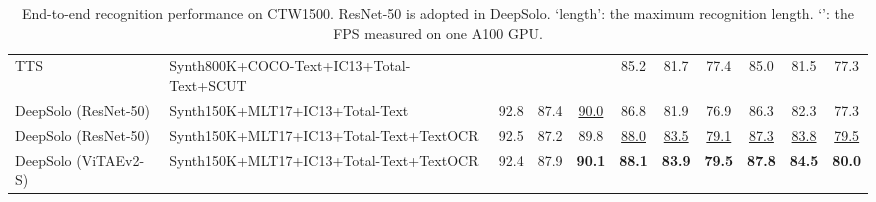 \documentclass[10pt,twocolumn,letterpaper]{article}
\begin{document}
\begin{table}[!t]
\begin{table*}[!t]
{\begin{tabular}{l|l|ccc|ccc|ccc}
TTS \cite{kittenplon2022towards} &Synth800K+COCO-Text+IC13+Total-Text+SCUT & & & &85.2 &81.7 &77.4 &85.0 &81.5 &77.3 \\
\rowcolor{gray!20} DeepSolo (ResNet-50) &Synth150K+MLT17+IC13+Total-Text &92.8 &87.4 &\underline{90.0} &86.8 &81.9 &76.9 &86.3 &82.3 &77.3 \\
\rowcolor{gray!20} DeepSolo (ResNet-50) &Synth150K+MLT17+IC13+Total-Text+TextOCR &92.5 &87.2 &89.8 &\underline{88.0} &\underline{83.5} &\underline{79.1} &\underline{87.3} &\underline{83.8} &\underline{79.5} \\
\rowcolor{gray!20} DeepSolo (ViTAEv2-S) &Synth150K+MLT17+IC13+Total-Text+TextOCR &92.4 &87.9 &\textbf{90.1} &\textbf{88.1} &\textbf{83.9} &\textbf{79.5} &\textbf{87.8} &\textbf{84.5} &\textbf{80.0} \\
\bottomrule[1.5pt]\end{tabular}}
\caption{Performance on ICDAR2015. ‘S’, ‘W’ and ‘G’ refer to using strong, weak and generic lexicons.}
\label{tab:main_ic15}
\end{table*}
\begin{table}[!t]
\centering
{}
\caption{End-to-end recognition performance on CTW1500. ResNet-50 is adopted in DeepSolo. ‘length’: the maximum recognition length. ‘\dag’: the FPS measured on one A100 GPU.}
\label{tab:main_ctw}
\vspace{-3mm}
\end{table}


\end{table}
\end{document}
